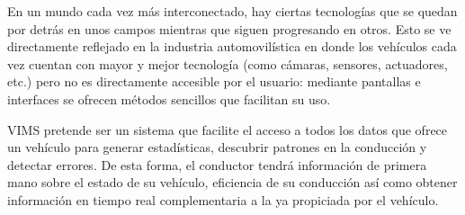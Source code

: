En un mundo cada vez más interconectado, hay ciertas tecnologías que se quedan
por detrás en unos campos mientras que siguen progresando en otros. Esto se ve
directamente reflejado en la industria automovilística en donde los vehículos
cada vez cuentan con mayor y mejor tecnología (como cámaras, sensores, actuadores,
etc.) pero no es directamente accesible por el usuario: mediante pantallas e
interfaces se ofrecen métodos sencillos que facilitan su uso.

\ac{VIMS} pretende ser un sistema que facilite el acceso a todos los datos que
ofrece un vehículo para generar estadísticas, descubrir patrones en la conducción
y detectar errores. De esta forma, el conductor tendrá información de primera
mano sobre el estado de su vehículo, eficiencia de su conducción así como obtener
información en tiempo real complementaria a la ya propiciada por el vehículo.
